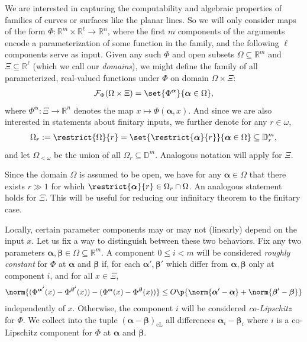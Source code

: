 We are interested in capturing the computability and algebraic properties of families of curves or surfaces like the planar lines. So we will only consider maps of the form $\Phi : \mathbb{R}^m \times \mathbb{R}^\ell \to \mathbb{R}^n$, where the first $m$ components of the arguments encode a parameterization of some function in the family, and the following $\ell$ components serve as input. Given any such $\Phi$ and open subsets $\Omega \subseteq \mathbb{R}^m$ and $\Xi \subseteq \mathbb{R}^\ell$ (which we call our \textit{domains}), we might define the family of all parameterized, real-valued functions under $\Phi$ on domain $\Omega \times \Xi$:
\begin{align*}
    \mathcal{F}_\Phi(\Omega \times \Xi) = \set{\Phi^{\boldsymbol{\alpha}}}{\boldsymbol{\alpha} \in \Omega},
\end{align*}
where $\Phi^{\boldsymbol{\alpha}} : \Xi \to \mathbb{R}^n$ denotes the map $x \mapsto \Phi(\boldsymbol{\alpha}, x)$. And since we are also interested in statements about finitary inputs, we further denote for any $r \in \omega$,
\begin{align*}
    \Omega_r := \restrict{\Omega}{r} = \set{\restrict{\boldsymbol{\alpha}}{r}}{\boldsymbol{\alpha} \in \Omega} \subseteq \mathbb{D}^m_r,
\end{align*}
and let $\Omega_{<\omega}$ be the union of all $\Omega_r \subseteq \mathbb{D}^m$. Analogous notation will apply for $\Xi$.

Since the domain $\Omega$ is assumed to be open, we have for any $\boldsymbol{\alpha} \in \Omega$ that there exists $r \gg 1$ for which $\restrict{\boldsymbol{\alpha}}{r} \in \Omega_r \cap \Omega$. An analogous statement holds for $\Xi$. This will be useful for reducing our infinitary theorem to the finitary case. 

Locally, certain parameter components may or may not (linearly) depend on the input $x$. Let us fix a way to distinguish between these two behaviors. Fix any two parameters $\boldsymbol{\alpha}, \boldsymbol{\beta} \in \Omega \subseteq \mathbb{R}^m$. A component $0 \leq i < m$ will be considered \textit{roughly constant} for $\Phi$ at $\boldsymbol{\alpha}$ and $\boldsymbol{\beta}$ if, for each $\boldsymbol{\alpha}', \boldsymbol{\beta}'$ which differ from $\boldsymbol{\alpha}, \boldsymbol{\beta}$ only at component $i$, and for all $x \in \Xi$,
\begin{align*}
    \norm{(\Phi^{\boldsymbol{\alpha'}}(x) - \Phi^{\boldsymbol{\beta'}}(x)) - (\Phi^{\boldsymbol{\alpha}}(x) - \Phi^{\boldsymbol{\beta}}(x))} \leq 
    O\p{\norm{\boldsymbol{\alpha}' - \boldsymbol{\alpha}} + \norm{\boldsymbol{\beta}' - \boldsymbol{\beta}}}
\end{align*}
independently of $x$. Otherwise, the component $i$ will be considered \textit{co-Lipschitz} for $\Phi$. We collect into the tuple $(\boldsymbol{\alpha} - \boldsymbol{\beta})_{\operatorname{cL}}$ all differences $\boldsymbol{\alpha}_i - \boldsymbol{\beta}_i$ where $i$ is a co-Lipschitz component for $\Phi$ at $\boldsymbol{\alpha}$ and $\boldsymbol{\beta}$.

